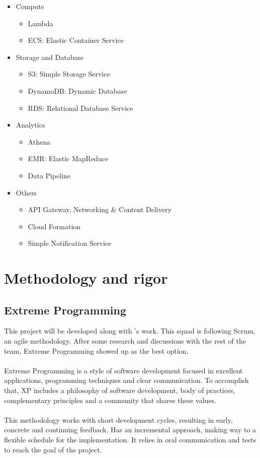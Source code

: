 \begin{itemize}
    \item Compute
    \begin{itemize}
        \item Lambda
        \item ECS: Elastic Container Service
    \end{itemize}
    \item Storage and Database
    \begin{itemize}
        \item S3: Simple Storage Service
        \item DynamoDB: Dynamic Database
        \item RDS: Relational Database Service
    \end{itemize}
    \item Analytics
    \begin{itemize}
        \item Athena
        \item EMR: Elastic MapReduce
        \item Data Pipeline
    \end{itemize}
    \item Others
    \begin{itemize}
        \item API Gateway, Networking \& Content Delivery
        \item Cloud Formation
        \item Simple Notification Service
    \end{itemize}
\end{itemize}


\section{Methodology and rigor} \label{methodology_rigor}

\subsection{Extreme Programming} \label{xp}

This project will be developed along with \squad's work. This squad is following Scrum, an agile methodology. After some research and discussions with the rest of the team, Extreme Programming\cite{xp} showed up as the best option.
\\\\
Extreme Programming is a style of software development focused in excellent applications, programming techniques and clear communication. To accomplish that, XP includes a philosophy of software development, body of practices, complementary principles and a community that shares these values.
\\\\
This methodology works with short development cycles, resulting in early, concrete and continuing feedback. Has an incremental approach, making way to a flexible schedule for the implementation. It relies in oral communication and tests to reach the goal of the project.

